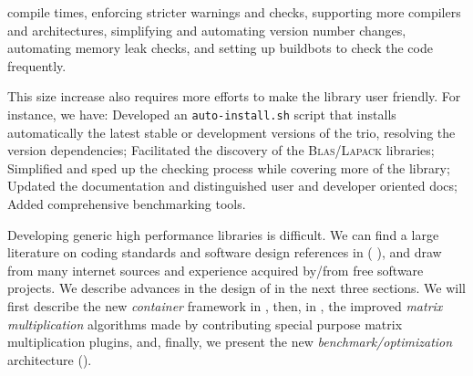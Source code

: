 compile times, enforcing stricter warnings and checks, supporting more
compilers and architectures, simplifying and automating version number
changes, automating memory leak checks, and setting up buildbots to check the code
frequently.
%
\par
%
This size increase also requires more efforts to make the library user friendly. For
instance, we have:
%
Developed an \texttt{auto-install.sh} script that installs automatically the
latest stable or development versions of the trio, resolving the version
dependencies;
%
Facilitated the discovery of the \textsc{Blas}/\textsc{Lapack} libraries;
%
Simplified and sped up the checking process while covering more of the library;
%
Updated the documentation and distinguished user and developer oriented docs;
%
Added comprehensive benchmarking tools.
%
%
\par
%
Developing generic high performance libraries is difficult. We can find a
large literature on coding standards and software design references in (\cf{}
\cite{alexandrescu:01:modern,gamma:95:design,sutter:05:cpp,stroustrup1994design,Douglas:05:GPHP}),
and draw from many internet sources and experience acquired by/from free
software projects.
%
%
We describe advances in the design of \linbox in the next
three sections. We will first describe the new \emph{container} framework in
, then,
in ,
the improved \emph{matrix multiplication} algorithms
made by contributing special purpose matrix multiplication plugins, and, finally, we present the new \emph{benchmark/optimization}
architecture ().
%
\par

